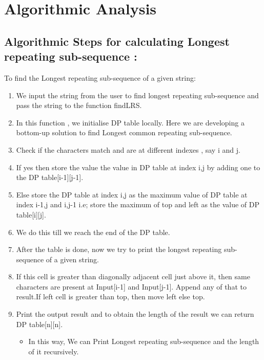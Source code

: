 \documentclass[conference]{IEEEtran}
\begin{document}
\section{Algorithmic Analysis}


\subsection{Algorithmic Steps for calculating Longest repeating sub-sequence :}\label{AA}
To find the Longest repeating sub-sequence of a given string: 

\begin{enumerate}
\item We input the string from the user to find longest repeating sub-sequence and  pass the string to the function findLRS.
\item In this function , we initialise DP table locally. Here we are developing a bottom-up solution to find Longest common repeating sub-sequence.
\item Check if the characters match and are at different indexes , say i and j.
\item If yes then store the value the value in DP table at index i,j by adding one to the DP table[i-1][j-1].
\item Else store the DP table at index i,j as the maximum value of DP table at index i-1,j and i,j-1 i.e; store the maximum of top and left as the value of DP table[i][j].
\item We do this till we reach the end of the DP table.
\item After the table is done, now we try to print the longest repeating sub-sequence of a given string.
\item If this cell is greater than diagonally adjacent cell just above it, then same characters are present at Input[i-1] and Input[j-1]. Append any of that to result.If left cell is greater than top, then move left else top.
 \item Print the output result and to obtain the length of the result we can return DP table[n][n]. 
\begin{itemize}
\item In this way, We can Print Longest repeating sub-sequence and the length of it recursively.
\end{itemize}
\end{enumerate}
\end{document}
